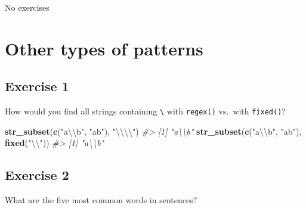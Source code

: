 \documentclass[]{book}
\newenvironment{Shaded}{\begin{snugshade}}{\end{snugshade}}
\newcommand{\CharTok}[1]{\textcolor[rgb]{0.31,0.60,0.02}{#1}}
\newcommand{\CommentTok}[1]{\textcolor[rgb]{0.56,0.35,0.01}{\textit{#1}}}
\newcommand{\DataTypeTok}[1]{\textcolor[rgb]{0.13,0.29,0.53}{#1}}
\newcommand{\DecValTok}[1]{\textcolor[rgb]{0.00,0.00,0.81}{#1}}
\newcommand{\KeywordTok}[1]{\textcolor[rgb]{0.13,0.29,0.53}{\textbf{#1}}}
\newcommand{\NormalTok}[1]{#1}
\newcommand{\OperatorTok}[1]{\textcolor[rgb]{0.81,0.36,0.00}{\textbf{#1}}}
\newcommand{\OtherTok}[1]{\textcolor[rgb]{0.56,0.35,0.01}{#1}}
\newcommand{\StringTok}[1]{\textcolor[rgb]{0.31,0.60,0.02}{#1}}
\theoremstyle{definition}
\theoremstyle{definition}
\theoremstyle{definition}
\theoremstyle{remark}
\begin{document}
No exercises

\hypertarget{other-types-of-patterns}{%
\section{Other types of patterns}\label{other-types-of-patterns}}

\hypertarget{exercise-1-36}{%
\subsection{Exercise 1}\label{exercise-1-36}}

How would you find all strings containing \texttt{\textbackslash{}} with
\texttt{regex()} vs.~with \texttt{fixed()}?

\begin{Shaded}
\begin{Highlighting}[]
\KeywordTok{str_subset}\NormalTok{(}\KeywordTok{c}\NormalTok{(}\StringTok{"a}\CharTok{\textbackslash{}\textbackslash{}}\StringTok{b"}\NormalTok{, }\StringTok{"ab"}\NormalTok{), }\StringTok{"}\CharTok{\textbackslash{}\textbackslash{}\textbackslash{}\textbackslash{}}\StringTok{"}\NormalTok{)}
\CommentTok{#> [1] "a\textbackslash{}\textbackslash{}b"}
\KeywordTok{str_subset}\NormalTok{(}\KeywordTok{c}\NormalTok{(}\StringTok{"a}\CharTok{\textbackslash{}\textbackslash{}}\StringTok{b"}\NormalTok{, }\StringTok{"ab"}\NormalTok{), }\KeywordTok{fixed}\NormalTok{(}\StringTok{"}\CharTok{\textbackslash{}\textbackslash{}}\StringTok{"}\NormalTok{))}
\CommentTok{#> [1] "a\textbackslash{}\textbackslash{}b"}
\end{Highlighting}
\end{Shaded}

\hypertarget{exercise-2-35}{%
\subsection{Exercise 2}\label{exercise-2-35}}

What are the five most common words in sentences?

\begin{Shaded}
\end{Shaded}
\end{document}

